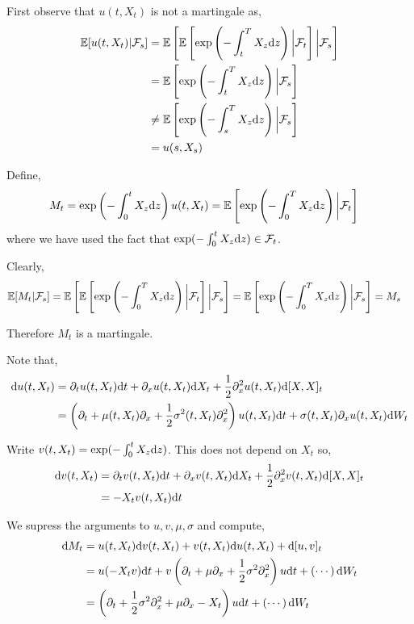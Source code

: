 \documentclass[10pt]{article}
\begin{document}
\begin{solution}
    First observe that \( u(t,X_t) \) is not a martingale as,
\begin{align*}
    \mathbb{E}[u(t,X_t) | \mathcal{F}_s] 
    &= \mathbb{E} \left[ \mathbb{E} \left[ \exp \left( -\int_t^T X_z\mathrm{d} z \right) \bigg| \mathcal{F}_t \right] \bigg| \mathcal{F}_s \right]
    \\&= \mathbb{E} \left[ \exp \left( -\int_t^T X_z\mathrm{d} z \right) \bigg| \mathcal{F}_s \right]
    \\&\neq \mathbb{E} \left[ \exp \left( -\int_s^T X_z\mathrm{d} z \right) \bigg| \mathcal{F}_s \right]
    \\&= u(s,X_s)
\end{align*}

Define,
\begin{align*}
    M_t &= \exp \left( -\int_0^t X_z\mathrm{d} z \right) u(t,X_t)
    = \mathbb{E} \left[ \exp \left( -\int_0^T X_z\mathrm{d} z \right) \bigg| \mathcal{F}_t \right]
\end{align*}
    where we have used the fact that \( \exp(-\int_0^t X_z\mathrm{d} z) \in \mathcal{F}_t \).

Clearly,
\begin{align*}
    \mathbb{E}[M_t|\mathcal{F}_s] 
    &= \mathbb{E} \left[ \mathbb{E} \left[ \exp \left( -\int_0^T X_z\mathrm{d} z \right) \bigg| \mathcal{F}_t \right] \bigg|\mathcal{F}_s \right]
    = \mathbb{E} \left[ \exp \left( -\int_0^T X_z\mathrm{d} z \right) \bigg| \mathcal{F}_s \right]
    = M_s
\end{align*}

    Therefore \( M_t \) is a martingale.

    Note that,
    \begin{align*}
        \mathrm{d} u(t,X_t) &= \partial_t u(t,X_t) \mathrm{d} t + \partial_x u(t,X_t) \mathrm{d} X_t + \frac{1}{2} \partial_x^2 u(t,X_t) \mathrm{d}[X,X]_t 
        \\&= \left(\partial_t + \mu(t,X_t) \partial_x + \frac{1}{2}\sigma^2(t,X_t) \partial_x^2 \right) u(t,X_t) \mathrm{d} t + \sigma(t,X_t) \partial_x u(t,X_t)\mathrm{d} W_t
    \end{align*}
    
    Write \( v(t,X_t) = \exp(-\int_0^t X_z\mathrm{d} z) \). This does not depend on \( X_t \) so,
    \begin{align*}
        \mathrm{d} v(t,X_t) &= 
        \partial_t v(t,X_t) \mathrm{d} t + \partial_x v(t,X_t) \mathrm{d} X_t + \frac{1}{2} \partial_x^2 v(t,X_t) \mathrm{d}[X,X]_t
        \\&= -X_t v(t,X_t) \mathrm{d} t
    \end{align*}

    We supress the arguments to \( u,v,\mu,\sigma \) and compute,
\begin{align*}
    \mathrm{d} M_t &= u(t,X_t) \mathrm{d} v(t,X_t) + v(t,X_t) \mathrm{d} u(t,X_t) + \mathrm{d}[u,v]_t 
    \\&= u(-X_t v)\mathrm{d} t + v \left( \partial_t + \mu \partial_x + \frac{1}{2}\sigma^2\partial_x^2 \right) u \mathrm{d} t + \left( \cdots \right)\mathrm{d} W_t 
    \\&= \left( \partial_t + \frac{1}{2}\sigma^2\partial_x^2 + \mu \partial_x - X_t \right)u \mathrm{d} t + \left( \cdots \right)\mathrm{d} W_t
\end{align*}


\end{solution}
\end{document}
